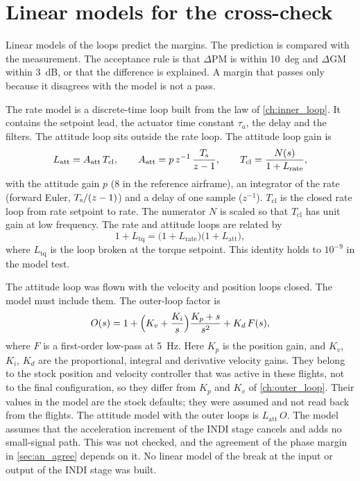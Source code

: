 \section{Linear models for the cross-check}\label{sec:an_models}

Linear models of the loops predict the margins.
The prediction is compared with the measurement.
The acceptance rule is that $\Delta\mathrm{PM}$ is within 10~deg and $\Delta\mathrm{GM}$ within 3~dB, or that the difference is explained. A margin that passes only because it disagrees with the model is not a pass.

The rate model is a discrete-time loop built from the law of \cref{ch:inner_loop}.
It contains the setpoint lead, the actuator time constant $\tau_a$, the delay and the filters.
The attitude loop sits outside the rate loop.
The attitude loop gain is
\begin{equation}\label{eq:an_att}
  L_{\mathrm{att}} = A_{\mathrm{att}}\,T_{\mathrm{cl}} ,\qquad
  A_{\mathrm{att}} = p\,z^{-1}\,\frac{T_{\mathrm{s}}}{z-1} ,\qquad
  T_{\mathrm{cl}} = \frac{N(s)}{1+L_{\mathrm{rate}}} ,
\end{equation}
with the attitude gain $p$ (8 in the reference airframe), an integrator of the rate (forward Euler, $T_{\mathrm{s}}/(z-1)$) and a delay of one sample ($z^{-1}$).
$T_{\mathrm{cl}}$ is the closed rate loop from rate setpoint to rate.
The numerator $N$ is scaled so that $T_{\mathrm{cl}}$ has unit gain at low frequency.
The rate and attitude loops are related by
\begin{equation}\label{eq:an_ident}
  1 + L_{\mathrm{tq}} = \bigl(1+L_{\mathrm{rate}}\bigr)\bigl(1+L_{\mathrm{att}}\bigr) ,
\end{equation}
where $L_{\mathrm{tq}}$ is the loop broken at the torque setpoint.
This identity holds to $10^{-9}$ in the model test.

The attitude loop was flown with the velocity and position loops closed.
The model must include them.
The outer-loop factor is
\begin{equation}\label{eq:an_outer}
  O(s) = 1 + \Bigl(K_v + \frac{K_i}{s}\Bigr)\frac{K_p + s}{s^{2}} + K_d\,F(s) ,
\end{equation}
where $F$ is a first-order low-pass at 5~Hz.
Here $K_p$ is the position gain, and $K_v$, $K_i$, $K_d$ are the proportional, integral and derivative velocity gains.
They belong to the stock position and velocity controller that was active in these flights, not to the final configuration, so they differ from $K_p$ and $K_v$ of \cref{ch:outer_loop}.
Their values in the model are the stock defaults; they were assumed and not read back from the flights.
The attitude model with the outer loops is $L_{\mathrm{att}}\,O$.
The model assumes that the acceleration increment of the INDI stage cancels and adds no small-signal path.
This was not checked, and the agreement of the phase margin in \cref{sec:an_agree} depends on it.
No linear model of the break at the input or output of the INDI stage was built.

